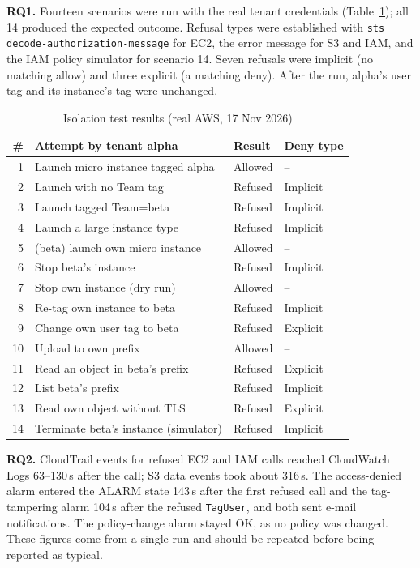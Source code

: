 \documentclass[conference]{IEEEtran}
\begin{document}
\textbf{RQ1.} Fourteen scenarios were run with the real tenant credentials (Table~\ref{tab:results}); all 14 produced the expected outcome. Refusal types were established with \texttt{sts decode-authorization-message} for EC2, the error message for S3 and IAM, and the IAM policy simulator for scenario 14. Seven refusals were implicit (no matching allow) and three explicit (a matching deny). After the run, alpha's user tag and its instance's tag were unchanged.

\begin{table}[t]
\caption{Isolation test results (real AWS, 17 Nov 2026)}
\label{tab:results}
\centering
\footnotesize
\begin{tabular}{@{}rlll@{}}
\toprule
\# & Attempt by tenant alpha & Result & Deny type \\
\midrule
1 & Launch micro instance tagged alpha & Allowed & -- \\
2 & Launch with no Team tag & Refused & Implicit \\
3 & Launch tagged Team=beta & Refused & Implicit \\
4 & Launch a large instance type & Refused & Implicit \\
5 & (beta) launch own micro instance & Allowed & -- \\
6 & Stop beta's instance & Refused & Implicit \\
7 & Stop own instance (dry run) & Allowed & -- \\
8 & Re-tag own instance to beta & Refused & Implicit \\
9 & Change own user tag to beta & Refused & Explicit \\
10 & Upload to own prefix & Allowed & -- \\
11 & Read an object in beta's prefix & Refused & Explicit \\
12 & List beta's prefix & Refused & Implicit \\
13 & Read own object without TLS & Refused & Explicit \\
14 & Terminate beta's instance (simulator) & Refused & Implicit \\
\bottomrule
\end{tabular}
\end{table}

\textbf{RQ2.} CloudTrail events for refused EC2 and IAM calls reached CloudWatch Logs 63--130\,s after the call; S3 data events took about 316\,s. The access-denied alarm entered the ALARM state 143\,s after the first refused call and the tag-tampering alarm 104\,s after the refused \texttt{TagUser}, and both sent e-mail notifications. The policy-change alarm stayed OK, as no policy was changed. These figures come from a single run and should be repeated before being reported as typical.
\end{document}
